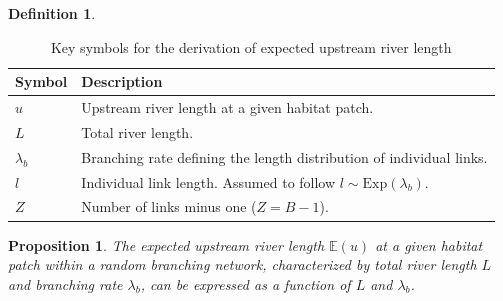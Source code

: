 \documentclass[11pt, class=article, crop=false]{standalone}
\newtheorem{proposition}{Proposition}[subsection]
\theoremstyle{definition}
\newtheorem{definition}{Definition}[subsection]
\begin{document}
\begin{definition}
\begin{table}
    \centering
    \caption{Key symbols for the derivation of expected upstream river length}
    \begin{tabularx}{\textwidth}{ll}
        \hline
        Symbol & Description\\
        \hline
        $u$ & Upstream river length at a given habitat patch.\\
        $L$ & Total river length.\\
        $\lambda_b$ & Branching rate defining the length distribution of individual links.\\
        $l$ & Individual link length. Assumed to follow $l \sim \mbox{Exp}(\lambda_b)$.\\
        $Z$ & Number of links minus one ($Z = B - 1$).\\
        \hline
    \end{tabularx}
    \label{tab:key-symbol}
\end{table}

\end{definition}

\begin{proposition}
The expected upstream river length $\mathbb{E}(u)$ at a given habitat patch within a random branching network, characterized by total river length $L$ and branching rate $\lambda_b$, can be expressed as a function of $L$ and $\lambda_b$.
\end{proposition}
\end{document}
